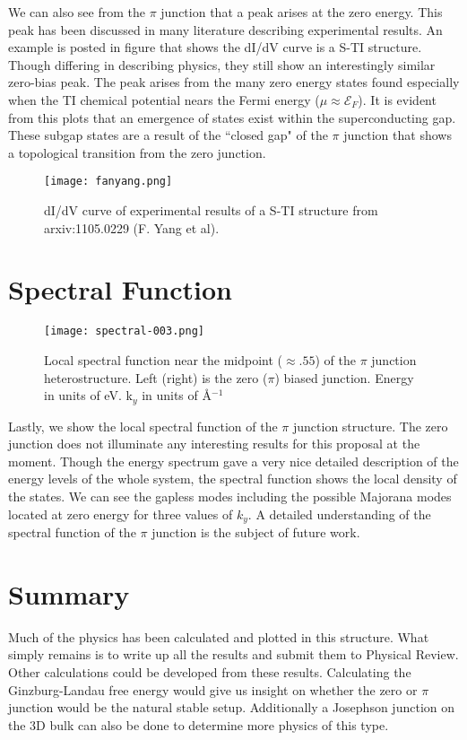 \documentclass[11pt,revtex,aps]{report}
\begin{document}
We can also see from the $\pi$ junction that a peak arises at the zero energy. This peak has been discussed in many literature describing experimental results. An example is posted in figure \cite{fanyang} that shows the dI/dV curve is a S-TI structure. Though differing in describing physics, they still show an interestingly similar zero-bias peak. The peak arises from the many zero energy states found especially when the TI chemical potential nears the Fermi energy ($\mu \approx \mathcal{E}_F$). It is evident from this plots that an emergence of states exist within the superconducting gap. These subgap states are a result of the ``closed gap" of the $\pi$ junction that shows a topological transition from the zero junction. 

\begin{figure}[h]
\center
\texttt{[image: fanyang.png]}
\caption{dI/dV curve of experimental results of a S-TI structure from arxiv:1105.0229 (F. Yang et al).
}\label{fanyang}
\end{figure}

\clearpage
\section{Spectral Function}
\begin{figure}
\center
\texttt{[image: spectral-003.png]}
\caption{Local spectral function near the midpoint ($\approx .55$) of the $\pi$ junction heterostructure. Left (right) is the zero ($\pi$) biased junction. Energy in units of eV. k$_y$ in units of \AA$^{-1}$
}\label{spectral-jj}
\end{figure}
Lastly, we show the local spectral function of the $\pi$ junction structure. The zero junction does not illuminate any interesting results for this proposal at the moment. Though the energy spectrum gave a very nice detailed description of the energy levels of the whole system, the spectral function shows the local density of the states. We can see the gapless modes including the possible Majorana modes located at zero energy for three values of $k_y$. A detailed understanding of the spectral function of the $\pi$ junction is the subject of future work.

\section{Summary}
Much of the physics has been calculated and plotted in this structure. What simply remains is to write up all the results and submit them to Physical Review. Other calculations could be developed from these results. Calculating the Ginzburg-Landau free energy would give us insight on whether the zero or $\pi$ junction would be the natural stable setup. Additionally a Josephson junction on the 3D bulk can also be done to determine more physics of this type.
\end{document}
